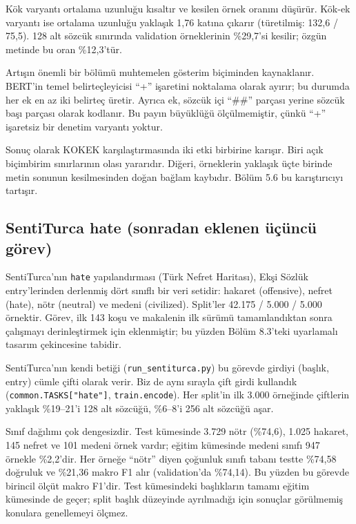 \documentclass[11pt]{article}
\begin{document}
Kök varyantı ortalama uzunluğu kısaltır ve kesilen örnek oranını düşürür. Kök-ek varyantı ise ortalama uzunluğu yaklaşık 1,76 katına çıkarır (türetilmiş: 132,6 / 75,5). 128 alt sözcük sınırında validation örneklerinin \%29,7'si kesilir; özgün metinde bu oran \%12,3'tür.

Artışın önemli bir bölümü muhtemelen gösterim biçiminden kaynaklanır. BERT'in temel belirteçleyicisi ``+'' işaretini noktalama olarak ayırır; bu durumda her ek en az iki belirteç üretir. Ayrıca ek, sözcük içi ``\#\#'' parçası yerine sözcük başı parçası olarak kodlanır. Bu payın büyüklüğü ölçülmemiştir, çünkü ``+'' işaretsiz bir denetim varyantı yoktur.

Sonuç olarak KOKEK karşılaştırmasında iki etki birbirine karışır. Biri açık biçimbirim sınırlarının olası yararıdır. Diğeri, örneklerin yaklaşık üçte birinde metin sonunun kesilmesinden doğan bağlam kaybıdır. Bölüm 5.6 bu karıştırıcıyı tartışır.

\subsection{SentiTurca hate (sonradan eklenen üçüncü görev)}

SentiTurca'nın \texttt{hate} yapılandırması (Türk Nefret Haritası), Ekşi Sözlük entry'lerinden derlenmiş dört sınıflı bir veri setidir: hakaret (offensive), nefret (hate), nötr (neutral) ve medeni (civilized). Split'ler 42.175 / 5.000 / 5.000 örnektir. Görev, ilk 143 koşu ve makalenin ilk sürümü tamamlandıktan sonra çalışmayı derinleştirmek için eklenmiştir; bu yüzden Bölüm 8.3'teki uyarlamalı tasarım çekincesine tabidir.

SentiTurca'nın kendi betiği (\texttt{run\_\allowbreak{}\allowbreak{}sentiturca.\allowbreak{}\allowbreak{}py}) bu görevde girdiyi (başlık, entry) cümle çifti olarak verir. Biz de aynı sırayla çift girdi kullandık (\texttt{common.\allowbreak{}\allowbreak{}TASKS["hate"]}, \texttt{train.\allowbreak{}\allowbreak{}encode}). Her split'in ilk 3.000 örneğinde çiftlerin yaklaşık \%19–21'i 128 alt sözcüğü, \%6–8'i 256 alt sözcüğü aşar.

Sınıf dağılımı çok dengesizdir. Test kümesinde 3.729 nötr (\%74,6), 1.025 hakaret, 145 nefret ve 101 medeni örnek vardır; eğitim kümesinde medeni sınıfı 947 örnekle \%2,2'dir. Her örneğe ``nötr'' diyen çoğunluk sınıfı tabanı testte \%74,58 doğruluk ve \%21,36 makro F1 alır (validation'da \%74,14). Bu yüzden bu görevde birincil ölçüt makro F1'dir. Test kümesindeki başlıkların tamamı eğitim kümesinde de geçer; split başlık düzeyinde ayrılmadığı için sonuçlar görülmemiş konulara genellemeyi ölçmez.
\end{document}
